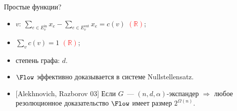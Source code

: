 \begin{frame}{Простые функции?}
    \begin{minipage}{0.5 \linewidth}
        
    \end{minipage}%
    \begin{minipage}{0.5 \linewidth}
        \pause
        \pause
        \begin{itemize}
            \item $v\colon ~ \sum\limits_{e \in E^{\mathrm{in}}_v} x_{e} -
                \sum\limits_{e \in E^{\mathrm{out}}_v} x_{e} = c(v)$ 
                \textcolor{red}{$(\mathbb{R})$};
            \item $\sum\limits_{v} c(v) = 1$ \textcolor{red}{$(\mathbb{R})$};
            \item степень графа: $d$.
        \end{itemize}
    \end{minipage}

    \pause
    \vspace{0.2cm}
    \begin{itemize}
        \item{} $\Flow$ эффективно доказывается в системе Nullstellensatz.
        \item{} [Alekhnovich, Razborov 03] Если $G$~--- $(n, d, \alpha)$-экспандер $\Rightarrow$ любое
            резолюционное доказательство $\Flow$ имеет размер $2^{\Omega(n)}$.
    \end{itemize}
\end{frame}


